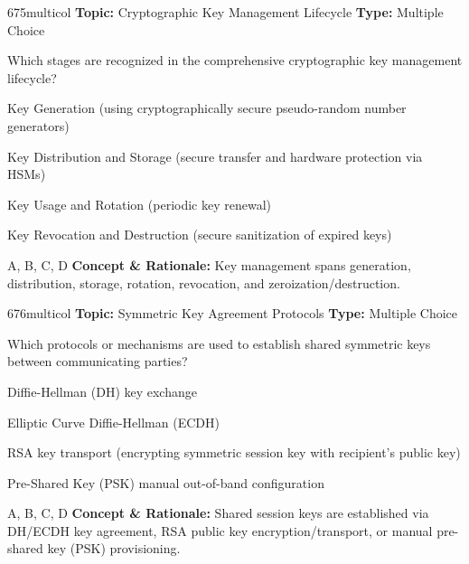 \begin{qcard}{675}{multicol}
\textcolor{darkslate!75}{\small\textbf{Topic:} Cryptographic Key Management Lifecycle \hfill \textbf{Type:} Multiple Choice}\vspace{0.4em}\par
Which stages are recognized in the comprehensive cryptographic key management lifecycle?
\begin{qoptions}
\item Key Generation (using cryptographically secure pseudo-random number generators)
\item Key Distribution and Storage (secure transfer and hardware protection via HSMs)
\item Key Usage and Rotation (periodic key renewal)
\item Key Revocation and Destruction (secure sanitization of expired keys)
\end{qoptions}
\end{qcard}
\nopagebreak
\begin{explainbox}{A, B, C, D}
\textbf{Concept \& Rationale:} Key management spans generation, distribution, storage, rotation, revocation, and zeroization/destruction.
\end{explainbox}

\begin{qcard}{676}{multicol}
\textcolor{darkslate!75}{\small\textbf{Topic:} Symmetric Key Agreement Protocols \hfill \textbf{Type:} Multiple Choice}\vspace{0.4em}\par
Which protocols or mechanisms are used to establish shared symmetric keys between communicating parties?
\begin{qoptions}
\item Diffie-Hellman (DH) key exchange
\item Elliptic Curve Diffie-Hellman (ECDH)
\item RSA key transport (encrypting symmetric session key with recipient's public key)
\item Pre-Shared Key (PSK) manual out-of-band configuration
\end{qoptions}
\end{qcard}
\nopagebreak
\begin{explainbox}{A, B, C, D}
\textbf{Concept \& Rationale:} Shared session keys are established via DH/ECDH key agreement, RSA public key encryption/transport, or manual pre-shared key (PSK) provisioning.
\end{explainbox}

